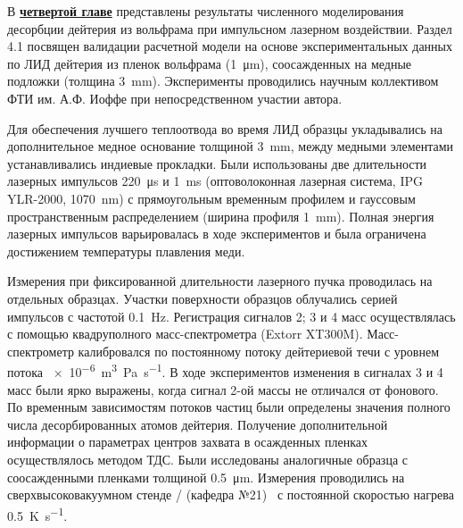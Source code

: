 В \underline{\textbf{четвертой главе}} представлены результаты численного моделирования десорбции дейтерия из вольфрама при импульсном лазерном воздействии. Раздел 4.1 посвящен валидации расчетной модели на основе экспериментальных данных по ЛИД дейтерия из пленок вольфрама (\SI{1}{\micro\meter}), соосажденных на медные подложки (толщина \SI{3}{\milli\meter}). Эксперименты проводились научным коллективом ФТИ им. А.Ф. Иоффе при непосредственном участии автора. 

Для обеспечения лучшего теплоотвода во время ЛИД образцы укладывались на дополнительное медное основание толщиной \SI{3}{\milli\meter}, между медными элементами устанавливались индиевые прокладки. Были использованы две длительности лазерных импульсов \SI{220}{\micro\second} и \SI{1}{\milli\second} (оптоволоконная лазерная система, IPG YLR-2000, \SI{1070}{\nano\metre}) с прямоугольным временным профилем и гауссовым пространственным распределением (ширина профиля \SI{1}{\milli\meter}). Полная энергия лазерных импульсов варьировалась в ходе экспериментов и была ограничена достижением температуры плавления меди. 

Измерения при фиксированной длительности лазерного пучка проводилась на отдельных образцах. Участки поверхности образцов облучались серией импульсов с частотой \SI{0.1}{\hertz}. Регистрация сигналов 2; 3 и 4 масс осуществлялась с помощью квадруполного масс-спектрометра (Extorr XT300M). Масс-спектрометр калибровался по постоянному потоку дейтериевой течи с уровнем потока \SI{e-6}{\metre\cubed\pascal\per\second}. В ходе экспериментов изменения в сигналах 3 и 4 масс были ярко выражены, когда сигнал 2-ой массы не отличался от фонового. По временным зависимостям потоков частиц были определены значения полного числа десорбированных атомов дейтерия. Получение дополнительной информации о параметрах центров захвата в осажденных пленках осуществлялось методом ТДС. Были исследованы аналогичные образца с соосажденными пленками толщиной \SI{0.5}{\micro\metre}. Измерения проводились на сверхвысоковакуумном стенде \thesisOrganizationShort / (кафедра №21)~\cite{Rusinov2009} с постоянной скоростью нагрева \SI{0.5}{\kelvin\per\second}.

